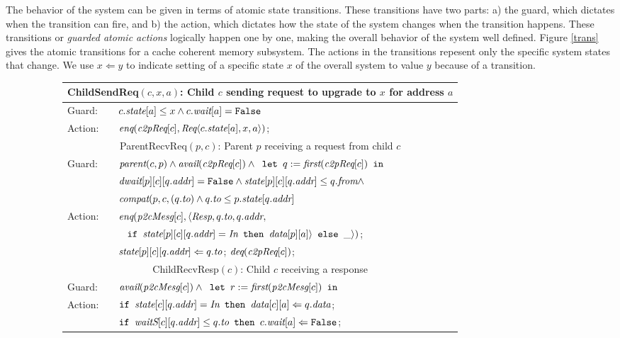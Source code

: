 The behavior of the system can be given in terms of atomic state transitions.
These transitions have two parts: a) the guard, which dictates when the
transition can fire, and b) the action, which dictates how the state of the
system changes when the transition happens. These transitions or \emph{guarded
atomic actions} logically happen one by one, making the overall behavior of the
system well defined. Figure \ref{trans} gives the atomic transitions for a
cache coherent memory subsystem. The actions in the transitions repesent only
the specific system states that change. We use $x \Leftarrow y$ to indicate
setting of a specific state $x$ of the overall system to value $y$ because of a
transition.
\begin{figure}
\small
\centering
\begin{subfigure}{\textwidth}
\centering
\begin{tabular}{|ll|}
\hline
\multicolumn{2}{|c|}{ChildSendReq$(c, x, a)$: Child $c$ sending request to upgrade to $x$ for address $a$}\\
\hline
Guard: & $c.\textit{state}[a] \le x \wedge c.\textit{wait}[a] = \texttt{False}$\\
\hline
Action: & $\textit{enq}(\textit{c2pReq}[c], \textit{Req}\langle c.\textit{state}[a], x, a \rangle)$;\\
\hline
\hline
\multicolumn{2}{|c|}{ParentRecvReq$(p, c)$: Parent $p$ receiving a request from child $c$}\\
\hline
Guard: & 
$\textit{parent}(c,p) \wedge \textit{avail}(\textit{c2pReq}[c]) \wedge \texttt{ let } q := \textit{first}(\textit{c2pReq}[c]) \texttt{ in }$\\
& $\textit{dwait}[p][c][q.\textit{addr}] = \texttt{False} \wedge \textit{state}[p][c][q.\textit{addr}] \le q.\textit{from} \wedge$\\
& $\textit{compat}(p, c, (q.\textit{to}) \wedge q.\textit{to} \le p.\textit{state}[q.\textit{addr}]$\\
\hline
Action: & $\textit{enq}(\textit{p2cMesg}[c], \langle \textit{Resp}, q.\textit{to}, q.\textit{addr}, $\\
& $\;\;\;\texttt{if } \textit{state}[p][c][q.\textit{addr}] = \textit{In} \texttt{ then } \textit{data}[p][a] \rangle \texttt{ else } \_\rangle)$;\\
& $\textit{state}[p][c][q.\textit{addr}] \Leftarrow q.\textit{to}$; $\textit{deq}(\textit{c2pReq}[c])$;\\
\hline
\hline
\multicolumn{2}{|c|}{ChildRecvResp$(c)$: Child $c$ receiving a response}\\
\hline
Guard: & 
$\textit{avail}(\textit{p2cMesg}[c]) \wedge \texttt{ let } r := \textit{first}(\textit{p2cMesg}[c]) \texttt{ in }$\\
\hline
Action: & $\texttt{if } \textit{state}[c][q.\textit{addr}] = \textit{In} \texttt{ then } \textit{data}[c][a] \Leftarrow q.\textit{data}$;\\
&$\texttt{if } \textit{waitS}[c][q.\textit{addr}] \le q.\textit{to} \texttt{ then } c.\textit{wait}[a] \Leftarrow \texttt{False} $;\\

\end{tabular}
\end{subfigure}
\end{figure}
